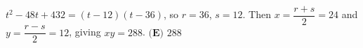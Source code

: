 \(t^2-48t+432=(t-12)(t-36)\), so \(r=36\), \(s=12\). Then \(x=\dfrac{r+s}{2}=24\) and \(y=\dfrac{r-s}{2}=12\), giving \(xy=288\). \(\boxed{\textbf{(E) } 288}\)
